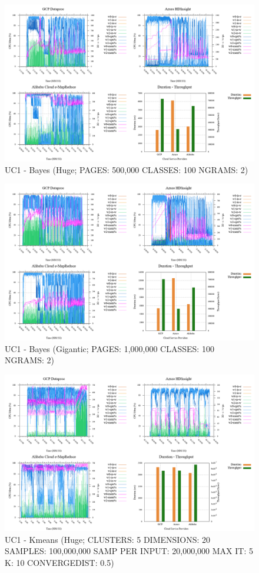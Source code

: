 \documentclass[review]{elsarticle}
\begin{document}
\begin{figure}[b]
	\caption{UC1 - Bayes (Huge; PAGES: 500,000 CLASSES: 100 NGRAMS: 2)}
	\includegraphics[width=\textwidth]{uc1-bayes-h-cmidt}
	\centering
\end{figure}

\begin{figure}[b]
	\caption{UC1 - Bayes (Gigantic; PAGES: 1,000,000 CLASSES: 100 NGRAMS: 2)}
	\includegraphics[width=\textwidth]{uc1-bayes-g-cmidt}
	\centering
\end{figure}

\begin{figure}[b]
	\caption{UC1 - Kmeans (Huge; CLUSTERS: 5 DIMENSIONS: 20 SAMPLES: 100,000,000 SAMP PER INPUT: 20,000,000 MAX IT: 5 K: 10 CONVERGEDIST: 0.5)}
	\includegraphics[width=\textwidth]{uc1-kmeans-h-cmidt}
	\centering
\end{figure}
\end{document}
